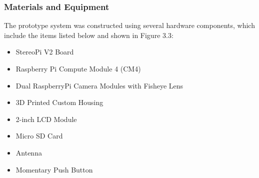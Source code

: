 
\subsubsection{Materials and Equipment}


The prototype system was constructed using several hardware components, which include the items listed below and shown in Figure 3.3:
\begin{itemize}
	\item StereoPi V2 Board
	\item Raspberry Pi Compute Module 4 (CM4)
	\item Dual RaspberryPi Camera Modules with Fisheye Lens
	\item 3D Printed Custom Housing
	\item 2-inch LCD Module
	\item Micro SD Card
	\item Antenna
	\item Momentary Push Button
\end{itemize}

